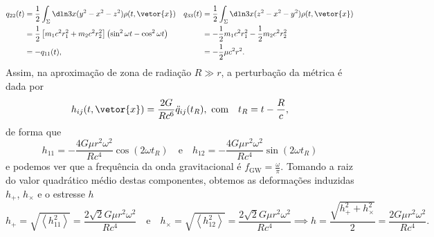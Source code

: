 \begin{align*}
    q_{22}(t) &= \frac12 \int_{\Sigma}\dln3x (y^2 - x^2 - z^2) \rho(t, \vetor{x})&
    q_{33}(t) &= \frac12 \int_{\Sigma}\dln3x (z^2 - x^2 - y^2) \rho(t, \vetor{x})\\
              &= \frac12\left[m_1c^2 r_1^2 + m_2 c^2r_2^2\right] \left(\sin^2\omega t - \cos^2 \omega t\right)&
              &= -\frac12 m_1c^2r_1^2  - \frac12 m_2c^2r_2^2\\
              &= - q_{11}(t),&
              &= - \frac12 \mu c^2 r^2.
\end{align*}
Assim, na aproximação de zona de radiação \(R \gg r\), a perturbação da métrica é dada por
\begin{equation*}
    h_{ij}(t, \vetor{x}) = \frac{2G}{Rc^6}\ddot{q}_{ij}(t_R),\text{ com}\quad t_R = t - \frac{R}{c},
\end{equation*}
de forma que
\begin{equation*}
    h_{11} = -\frac{4G\mu r^2\omega^2}{Rc^4}\cos(2\omega t_R)\quad\text{e}\quad h_{12} = -\frac{4G\mu r^2\omega^2}{Rc^4}\sin(2\omega t_R)
\end{equation*}
e podemos ver que a frequência da onda gravitacional é \(f_\mathrm{GW} = \frac{\omega}{\pi}\). Tomando a raiz do valor quadrático médio destas componentes, obtemos as deformações induzidas \(h_+\), \(h_\times\) e o estresse \(h\)
\begin{equation*}
    h_+ = \sqrt{\left\langle h_{11}^2\right\rangle} = \frac{2\sqrt{2}G\mu r^2\omega^2}{Rc^4}\quad\text{e}\quad
    h_\times = \sqrt{\left\langle h_{12}^2\right\rangle} = \frac{2\sqrt{2}G\mu r^2\omega^2}{Rc^4}\implies h = \frac{\sqrt{h_+^2 + h_\times^2}}{2} = \frac{2G\mu r^2 \omega^2}{Rc^4}.
\end{equation*}

